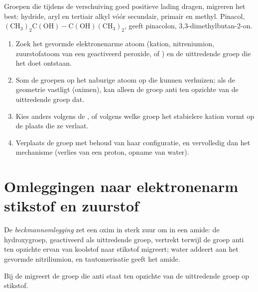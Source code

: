 Groepen die tijdens de verschuiving goed positieve lading dragen,
migreren het best: hydride, aryl en tertiair alkyl vóór secundair,
primair en methyl. Pinacol,
$\mathrm{(CH_3)_2C(OH){-}C(OH)(CH_3)_2}$, geeft pinacolon, 3,3-dimethylbutan-2-on.

\begin{method}\label{met:b3:radicals-carbenes:rearrangement}
\begin{enumerate}
  \item Zoek het gevormde elektronenarme atoom (kation, nitreniumion,
        zuurstofatoom van een geactiveerd peroxide,  of ) en
        de uittredende groep die het doet ontstaan.
  \item Som de groepen op het naburige atoom op die kunnen verhuizen; als
        de geometrie vastligt (oximen), kan alleen de groep anti ten
        opzichte van de uittredende groep dat.
  \item Kies anders volgens de , of volgens welke groep
        het stabielere kation vormt op de plaats die ze verlaat.
  \item Verplaats de groep met behoud van haar configuratie, en
        vervolledig dan het mechanisme (verlies van een proton, opname van
        water).
\end{enumerate}
\end{method}

\section{Omleggingen naar elektronenarm stikstof en zuurstof}

\begin{definition}[Beckmannomlegging]\label{def:b3:radicals-carbenes:beckmann}
De \emph{beckmannomlegging} zet een oxim in
sterk zuur om in een amide: de hydroxygroep, geactiveerd als uittredende
groep, vertrekt terwijl de groep anti ten opzichte ervan van koolstof
naar stikstof migreert; water addeert aan het gevormde nitriliumion, en
tautomerisatie geeft het amide.
\end{definition}

\begin{proposition}\label{prop:b3:radicals-carbenes:beckmann-anti}
Bij de  migreert de groep die anti staat ten opzichte
van de uittredende groep op stikstof.
\end{proposition}

